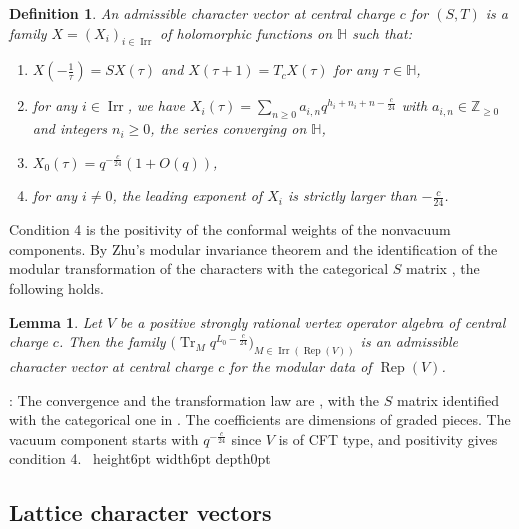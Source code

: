 \documentclass[leqno]{article}
\newcommand{\Z}{\ensuremath{\mathbb{Z}}}
\renewcommand{\geq}{\ensuremath{\geqslant}}
\newcommand{\qed}{\hfill \vrule height6pt  width6pt depth0pt}
\DeclareMathOperator{\Tr}{Tr}
\DeclareMathOperator{\Irr}{Irr}
\DeclareMathOperator{\Rep}{Rep}
\newtheorem{defi}[thm]{Definition}
\newtheorem{lemma}[thm]{Lemma}
\newenvironment{proof}[1][]{\noindent {\it Proof #1} : }{\hbox{~}\qed
\smallskip
}
\numberwithin{equation}{section}
\begin{document}
\begin{defi}
\label{def:admissible}
An admissible character vector at central charge $c$ for $(S,T)$ is a family $X = (X_i)_{i \in \Irr}$ of holomorphic functions on $\mathbb H$ such that:
\begin{enumerate}
\item $X(-\frac{1}{\tau}) = SX(\tau)$ and $X(\tau+1) = T_cX(\tau)$ for any $\tau \in \mathbb H$,
\item for any $i \in \Irr$, we have $X_i(\tau) = \sum_{n \geq 0} a_{i,n}q^{h_i+n_i+n-\frac{c}{24}}$ with $a_{i,n} \in \Z_{\geq 0}$ and integers $n_i \geq 0$, the series converging on $\mathbb H$,
\item $X_0(\tau) = q^{-\frac{c}{24}}(1+O(q))$,
\item for any $i \neq 0$, the leading exponent of $X_i$ is strictly larger than $-\frac{c}{24}$.
\end{enumerate}
\end{defi}

Condition 4 is the positivity of the conformal weights of the nonvacuum components. By Zhu's modular invariance theorem \cite{Zhu96} and the identification of the modular transformation of the characters with the categorical $S$ matrix \cite{Hua08}, the following holds.

\begin{lemma}
\label{lem:characters-admissible}
Let $V$ be a positive strongly rational vertex operator algebra of central charge $c$. Then the family $\big(\Tr_{M}q^{L_0-\frac{c}{24}}\big)_{M \in \Irr(\Rep(V))}$ is an admissible character vector at central charge $c$ for the modular data of $\Rep(V)$.
\end{lemma}

\begin{proof}
The convergence and the transformation law are \cite{Zhu96}, with the $S$ matrix identified with the categorical one in \cite{Hua08}. The coefficients are dimensions of graded pieces. The vacuum component starts with $q^{-\frac{c}{24}}$ since $V$ is of CFT type, and positivity gives condition 4.
\end{proof}

\subsection{Lattice character vectors}
\end{document}
